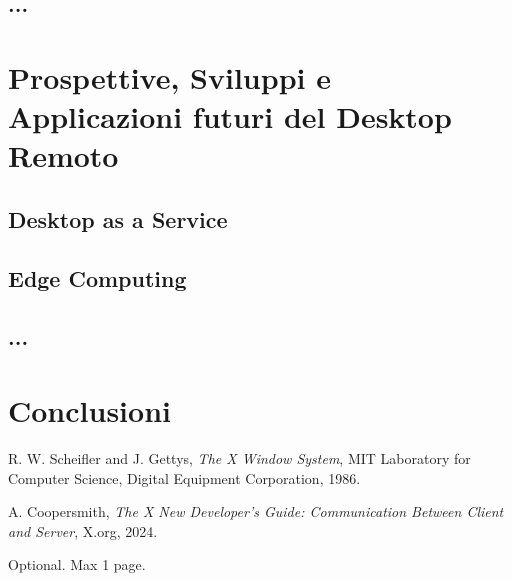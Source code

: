 \documentclass[12pt,a4paper,openright,twoside]{book}
\begin{document}
\section{...}

\chapter{Prospettive, Sviluppi e Applicazioni futuri del Desktop Remoto}

\section{Desktop as a Service}

\section{Edge Computing}

\section{...}

\chapter{Conclusioni}
\label{chap:conclusions}


\backmatter

\nocite{*} %




\begin{thebibliography}{9}
    R. W. Scheifler and J. Gettys, \textit{The X Window System}, MIT Laboratory for Computer Science, Digital Equipment Corporation, 1986.
    
    A. Coopersmith, \textit{The X New Developer’s Guide: Communication Between Client and Server}, X.org, 2024.
\end{thebibliography}
    

\begin{acknowledgements} %
Optional. Max 1 page.
\end{acknowledgements}
\end{document}
